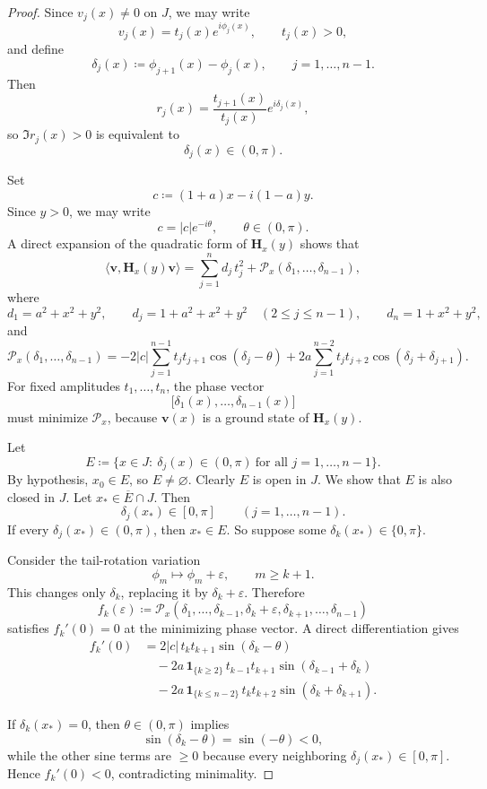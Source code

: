 \documentclass[11pt]{article}
\begin{document}
\begin{proof}
Since \(v_j(x)\neq 0\) on \(J\), we may write
\[
v_j(x)=t_j(x)e^{i\phi_j(x)},
\qquad
t_j(x)>0,
\]
and define
\[
\delta_j(x)\coloneqq \phi_{j+1}(x)-\phi_j(x),
\qquad
j=1,\dots,n-1.
\]
Then
\[
r_j(x)=\frac{t_{j+1}(x)}{t_j(x)}e^{i\delta_j(x)},
\]
so \(\Im r_j(x)>0\) is equivalent to
\[
\delta_j(x)\in(0,\pi).
\]

Set
\[
c\coloneqq (1+a)x-i(1-a)y.
\]
Since \(y>0\), we may write
\[
c=|c|e^{-i\theta},
\qquad
\theta\in(0,\pi).
\]
A direct expansion of the quadratic form of \(\mathbf H_x(y)\) shows that
\[
\langle \mathbf v,\mathbf H_x(y)\mathbf v\rangle
=
\sum_{j=1}^n d_j\,t_j^2
+
\mathcal P_x(\delta_1,\dots,\delta_{n-1}),
\]
where
\[
d_1=a^2+x^2+y^2,
\qquad
d_j=1+a^2+x^2+y^2\quad(2\le j\le n-1),
\qquad
d_n=1+x^2+y^2,
\]
and
\[
\mathcal P_x(\delta_1,\dots,\delta_{n-1})
=
-2|c|\sum_{j=1}^{n-1} t_j t_{j+1}\cos(\delta_j-\theta)
+
2a\sum_{j=1}^{n-2} t_j t_{j+2}\cos(\delta_j+\delta_{j+1}).
\]
For fixed amplitudes \(t_1,\dots,t_n\), the phase vector
\[
\bigl[\delta_1(x),\dots,\delta_{n-1}(x)\bigr]
\]
must minimize \(\mathcal P_x\), because \(\mathbf v(x)\) is a ground state of \(\mathbf H_x(y)\).

Let
\[
E\coloneqq \{x\in J:\ \delta_j(x)\in(0,\pi)\ \text{for all }j=1,\dots,n-1\}.
\]
By hypothesis, \(x_0\in E\), so \(E\neq\varnothing\). Clearly \(E\) is open in \(J\). We show that \(E\) is also closed in \(J\). Let \(x_*\in \overline E\cap J\). Then
\[
\delta_j(x_*)\in[0,\pi]
\qquad
(j=1,\dots,n-1).
\]
If every \(\delta_j(x_*)\in(0,\pi)\), then \(x_*\in E\). So suppose some \(\delta_k(x_*)\in\{0,\pi\}\).

Consider the tail-rotation variation
\[
\phi_m\mapsto \phi_m+\varepsilon,
\qquad
m\ge k+1.
\]
This changes only \(\delta_k\), replacing it by \(\delta_k+\varepsilon\). Therefore
\[
f_k(\varepsilon)\coloneqq
\mathcal P_x(\delta_1,\dots,\delta_{k-1},\delta_k+\varepsilon,\delta_{k+1},\dots,\delta_{n-1})
\]
satisfies \(f_k'(0)=0\) at the minimizing phase vector. A direct differentiation gives
\begin{align*}
f_k'(0)
&=
2|c|\,t_k t_{k+1}\sin(\delta_k-\theta) \\
&\quad
-2a\,\mathbf 1_{\{k\ge 2\}}\,t_{k-1}t_{k+1}\sin(\delta_{k-1}+\delta_k) \\
&\quad
-2a\,\mathbf 1_{\{k\le n-2\}}\,t_k t_{k+2}\sin(\delta_k+\delta_{k+1}).
\end{align*}

If \(\delta_k(x_*)=0\), then \(\theta\in(0,\pi)\) implies
\[
\sin(\delta_k-\theta)=\sin(-\theta)<0,
\]
while the other sine terms are \(\ge 0\) because every neighboring \(\delta_j(x_*)\in[0,\pi]\). Hence \(f_k'(0)<0\), contradicting minimality.


\end{proof}
\end{document}
